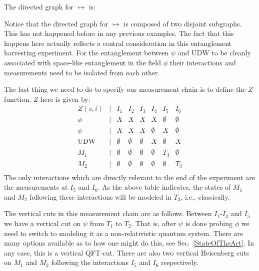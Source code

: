 \documentclass[prd,twocolumn,superscriptaddress,floatfix,amsmath,amssymb,amsfonts,nofootinbib]{revtex4-2}
\begin{document}
The directed graph for $\mapsto$ is:
\begin{center}
\end{center}
Notice that the directed graph for $\mapsto$ is composed of two disjoint subgraphs. This has not happened before in any previous examples. The fact that this happens here actually reflects a central consideration in this entanglement harvesting experiment. For the entanglement between $\psi$ and $\text{UDW}$ to be cleanly associated with space-like entanglement in the field $\phi$ their interactions and measurements need to be isolated from each other.

The last thing we need to do to specify our measurement chain is to define the $Z$ function. $Z$ here is given by:
\[\begin{array}{cccccccc}
Z(s,i) & \vert & I_1 & I_2 & I_3 & I_4 & I_5 & I_6\\
\phi & \vert & X & X & X & X & \emptyset & \emptyset\\
\psi & \vert & X & X & X & \emptyset & X & \emptyset\\
\text{UDW} & \vert & \emptyset & \emptyset & \emptyset & X & \emptyset & X\\
M_1 & \vert & \emptyset & \emptyset & \emptyset & \emptyset & T_3 & \emptyset\\
M_2 & \vert & \emptyset & \emptyset & \emptyset & \emptyset & \emptyset & T_3\\
\end{array}\]
The only interactions which are directly relevant to the end of the experiment are the measurements at $I_5$ and $I_6$. As the above table indicates, the states of $M_1$ and $M_2$ following these interactions will be modeled in $T_3$, i.e., classically.

The vertical cuts in this measurement chain are as follows. Between $I_1$-$I_3$ and $I_5$ we have a vertical cut on $\psi$ from $T_1$ to $T_2$. That is, after $\psi$ is done probing $\phi$ we need to switch to modeling it as a non-relativistic quantum system. There are many options available as to how one might do this, see Sec.~\ref{StateOfTheArt}. In any case, this is a vertical QFT-cut. There are also two vertical Heisenberg cuts on $M_1$ and $M_2$ following the interactions $I_5$ and $I_6$ respectively.  
\end{document}
